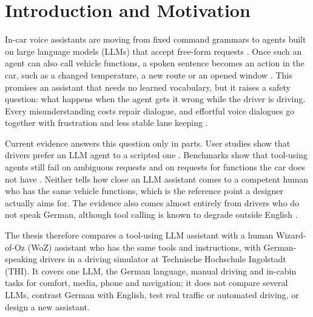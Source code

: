 \documentclass[
    a4paper,
    11pt,
    DIV=11,
    bigheadings,
    idxtotoc,
    listof=totoc,
    bibtotoc,
    halfparskip,
    cleardoubleempty,
    openright,
    oneside
]{scrartcl}
\begin{document}
\restoregeometry

\thispagestyle{myPageStyle}
\tableofcontents
\cleardoublepage

\thispagestyle{myPageStyle}

\section{Introduction and Motivation}

In-car voice assistants are moving from fixed command grammars to agents built on large language models (LLMs) that accept free-form requests \cite{Alvarez26Do}.
Once such an agent can also call vehicle functions, a spoken sentence becomes an action in the car, such as a changed temperature, a new route or an opened window \cite{Kirmayr26CAR}.
This promises an assistant that needs no learned vocabulary, but it raises a safety question: what happens when the agent gets it wrong while the driver is driving.
Every misunderstanding costs repair dialogue, and effortful voice dialogues go together with frustration and less stable lane keeping \cite{Liu26Affective}.

Current evidence answers this question only in parts.
User studies show that drivers prefer an LLM agent to a scripted one \cite{Choe26ChatGPT}.
Benchmarks show that tool-using agents still fail on ambiguous requests and on requests for functions the car does not have \cite{Kirmayr26CAR}.
Neither tells how close an LLM assistant comes to a competent human who has the same vehicle functions, which is the reference point a designer actually aims for.
The evidence also comes almost entirely from drivers who do not speak German, although tool calling is known to degrade outside English \cite{Luo26Lost}.

The thesis therefore compares a tool-using LLM assistant with a human Wizard-of-Oz (WoZ) assistant who has the same tools and instructions, with German-speaking drivers in a driving simulator at Technische Hochschule Ingolstadt (THI).
It covers one LLM, the German language, manual driving and in-cabin tasks for comfort, media, phone and navigation; it does not compare several LLMs, contrast German with English, test real traffic or automated driving, or design a new assistant.
\end{document}
